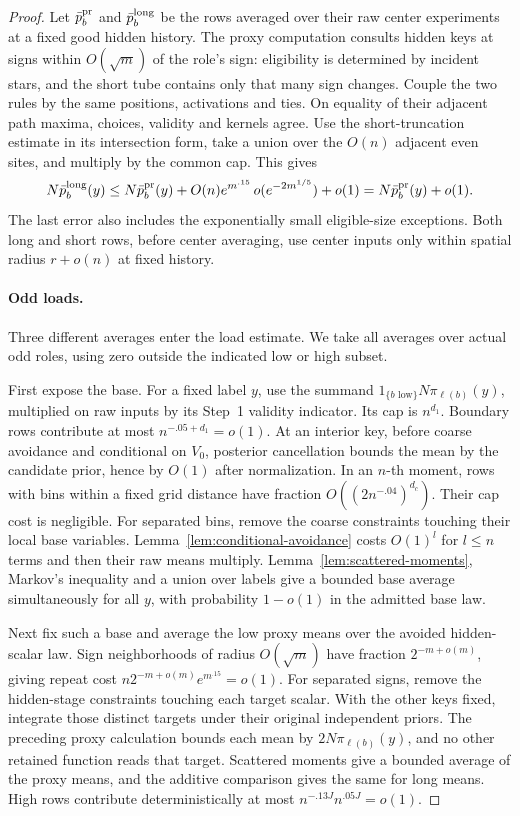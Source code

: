 \begin{proof}
Let \(\bar p_b^{\rm pr}\) and \(\bar p_b^{\rm long}\) be the rows
averaged over their raw center experiments at a fixed good hidden
history. The proxy computation consults hidden keys at signs within
\(O(\sqrt m)\) of the role's sign: eligibility is determined by incident
stars, and the short tube contains only that many sign changes.
Couple the two rules by the same positions, activations and ties.
On equality of their adjacent path maxima, choices, validity and kernels
agree. Use the short-truncation estimate in its intersection form,
take a union over the \(O(n)\) adjacent even sites, and multiply by the
common cap. This gives
\[
 N\bar p_b^{\rm long}(y)
 \le N\bar p_b^{\rm pr}(y)
       +O(n)e^{m^{.15}}\,o(e^{-2m^{1/5}})+o(1)
 =N\bar p_b^{\rm pr}(y)+o(1).
\]
The last error also includes the exponentially small eligible-size
exceptions. Both long and short rows, before center averaging, use
center inputs only within spatial radius \(r+o(n)\) at fixed history.

\paragraph{Odd loads.}
Three different averages enter the load estimate. We take all averages
over actual odd roles, using zero outside the indicated low or high
subset.

First expose the base. For a fixed label \(y\), use the summand
\(1_{\{b\text{ low}\}}N\pi_{\ell(b)}(y)\), multiplied on raw inputs
by its Step~1 validity indicator. Its cap is \(n^{d_1}\).
Boundary rows contribute at most \(n^{-.05+d_1}=o(1)\).
At an interior key, before coarse avoidance and conditional on \(V_0\),
posterior cancellation bounds the mean by the candidate prior, hence by
\(O(1)\) after normalization. In an \(n\)-th moment, rows with bins
within a fixed grid distance have fraction
\(O((2n^{-.04})^{d_c})\). Their cap cost is negligible.
For separated bins, remove the coarse constraints touching their local
base variables. Lemma~\ref{lem:conditional-avoidance} costs \(O(1)^l\)
for \(l\le n\) terms and then their raw means multiply.
Lemma~\ref{lem:scattered-moments}, Markov's inequality and a union over
labels give a bounded base average simultaneously for all \(y\), with
probability \(1-o(1)\) in the admitted base law.

Next fix such a base and average the low proxy means over the avoided
hidden-scalar law. Sign neighborhoods of radius \(O(\sqrt m)\) have
fraction \(2^{-m+o(m)}\), giving repeat cost
\(n2^{-m+o(m)}e^{m^{.15}}=o(1)\).
For separated signs, remove the hidden-stage constraints touching each
target scalar. With the other keys fixed, integrate those distinct
targets under their original independent priors. The preceding proxy
calculation bounds each mean by \(2N\pi_{\ell(b)}(y)\), and no other
retained function reads that target. Scattered moments give a bounded
average of the proxy means, and the additive comparison gives the same
for long means. High rows contribute deterministically at most
\(n^{-.13J}n^{.05J}=o(1)\).


\end{proof}
